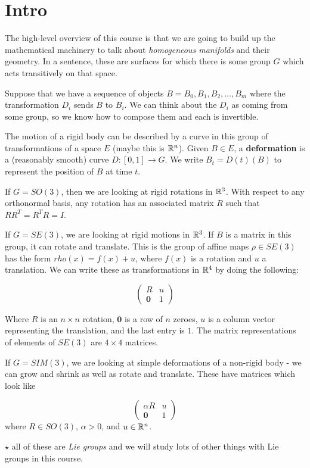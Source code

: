 
\section*{Intro}

The high-level overview of this course is that we are going to build up the mathematical machinery to talk about \textit{homogeneous manifolds} and their geometry.  In a sentence, these are surfaces for which there is some group $G$ which acts transitively on that space.

Suppose that we have a sequence of objects $B=B_0,B_1,B_2,\dots, B_m$ where the transformation $D_i$ sends $B$ to $B_i$.  We can think about the $D_i$ as coming from some group, so we know how to compose them and each is invertible.

The motion of a rigid body can be described by a curve in this group of transformations of a space $E$ (maybe this is $\mathbb{R}^n$).  Given $B\in E$, a \textbf{deformation} is a (reasonably smooth) curve $D:[0,1]\rightarrow G$.  We write $B_t=D(t)(B)$ to represent the position of $B$ at time $t$.

\begin{example}
	If $G=SO(3)$, then we are looking at rigid rotations in $\mathbb{R}^3$.  With respect to any orthonormal basis, any rotation has an associated matrix $R$ such that $RR^T=R^TR=I$.
	
	If $G=SE(3)$, we are looking at rigid motions in $\mathbb{R}^3$.  If $B$ is a matrix in this group, it can rotate and translate.  This is the group of affine maps $\rho\in SE(3)$ has the form $rho(x)=f(x)+u$, where $f(x)$ is a rotation and $u$ a translation.  We can write these as transformations in $\mathbb{R}^4$ by doing the following:
	
$$\begin{pmatrix}
		R&u\\
		\boldsymbol{0}&1
	\end{pmatrix}$$
	
	Where $R$ is an $n\times n$ rotation, $\boldsymbol{0}$ is a row of $n$ zeroes, $u$ is a column vector representing the translation, and the last entry is $1$.  The matrix representations of elements of $SE(3)$ are $4\times 4$ matrices.
	
	If $G=SIM(3)$, we are looking at simple deformations of a non-rigid body - we can grow and shrink as well as rotate and translate.  These have matrices which look like 
	
	$$\begin{pmatrix}
	\alpha R & u\\
	\boldsymbol{0} & 1
	\end{pmatrix}$$ where $R\in SO(3)$, $\alpha>0$, and $u\in \mathbb{R}^n$.
	
$\star$ all of these are \textit{Lie groups} and we will study lots of other things with Lie groups in this course.
\end{example}


